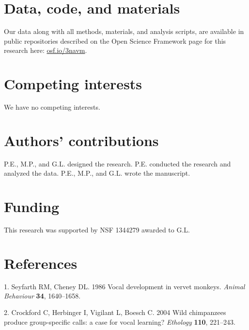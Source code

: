 \documentclass[english,floatsintext,man]{apa6}
\theoremstyle{definition}
\theoremstyle{definition}
\theoremstyle{definition}
\theoremstyle{remark}
\begin{document}
\hypertarget{data-code-and-materials}{%
\section{Data, code, and materials}\label{data-code-and-materials}}

Our data along with all methods, materials, and analysis scripts, are
available in public repositories described on the Open Science Framework
page for this research here: \href{https://osf.io/3navm}{osf.io/3navm}.

\hypertarget{competing-interests}{%
\section{Competing interests}\label{competing-interests}}

We have no competing interests.

\hypertarget{authors-contributions}{%
\section{Authors' contributions}\label{authors-contributions}}

P.E., M.P., and G.L. designed the research. P.E. conducted the research
and analyzed the data. P.E., M.P., and G.L. wrote the manuscript.

\hypertarget{funding}{%
\section{Funding}\label{funding}}

This research was supported by NSF 1344279 awarded to G.L.

\hypertarget{references}{%
\section{References}\label{references}}

\setlength{\parindent}{-0.5in}
\setlength{\leftskip}{0.5in}

\hypertarget{refs}{}
\leavevmode\hypertarget{ref-Seyfarth:1986tw}{}%
1. Seyfarth RM, Cheney DL. 1986 Vocal development in vervet monkeys.
\emph{Animal Behaviour} \textbf{34}, 1640--1658.

\leavevmode\hypertarget{ref-Crockford:2004cz}{}%
2. Crockford C, Herbinger I, Vigilant L, Boesch C. 2004 Wild chimpanzees
produce group-specific calls: a case for vocal learning? \emph{Ethology}
\textbf{110}, 221--243.
\end{document}

